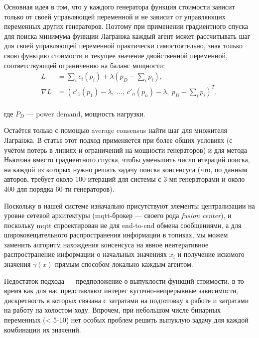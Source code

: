 \documentclass{report}
\begin{document}
\begin{itemize}
\begin{itemize}
Основная идея в том, что у каждого генератора функция стоимости зависит только от своей управляющей переменной и не зависит от управляющих переменных других генераторов.
Поэтому при применении градиентного спуска для поиска минимума функции Лагранжа каждый агент может рассчитывать шаг для своей управляющей переменной практически самостоятельно, зная только свою функцию стоимости и текущее значение двойственной переменной, соответствующей ограничению на баланс мощности:
\begin{equation}
\begin{split}
    L &= \sum_i c_i(p_i) + \lambda \left(p_D - \sum_i p_i \right),\\
    \nabla{L} &= 
    \left(
        {c'_1}(p_1) - \lambda,~
        \ldots,~ 
        c'_n(p_n) - \lambda,~
        p_D - \sum_i p_i 
    \right)^T,\\
\end{split}
\end{equation}

где $P_D$ --- power demand, мощность нагрузки. 

Остаётся только с помощью average consensus найти шаг для множителя Лагранжа. 
В статье этот подход применяется при более общих условиях (с учётом потерь в линиях и ограничений на мощности генераторов) и для метода Ньютона вместо градиентного спуска, чтобы уменьшить число итераций поиска, на каждой из которых нужно решать задачу поиска консенсуса (что, по данным авторов, требует около 100 итераций для системы с 3-мя генераторами и около 400 для порядка 60-ти генераторов).

\medskip

Поскольку в нашей системе изначально присутствуют элементы централизации на уровне сетевой архитектуры (mqtt-брокер --- своего рода \textit{fusion center}), и поскольку mqtt спроектирован не для end-to-end обмена сообщениями, а для широковещательного распространения информации в топиках, мы можем заменить алгоритм нахождения консенсуса на явное неитеративное распространение информации о начальных значениях $x_i$ и получение искомого значения $\gamma(x)$ прямым способом локально каждым агентом.

Недостаток подхода --- предположение о выпуклости функций стоимости, в то время как для нас представляют интерес кусочно-непрерывные зависимости, дискретность в которых связана с затратами на подготовку к работе и затратами на работу на холостом ходу. 
Впрочем, при небольшом числе бинарных переменных (< 5-10) нет особых проблем решить выпуклую задачу для каждой комбинации их значений.


\end{itemize}
\end{itemize}
\end{document}
